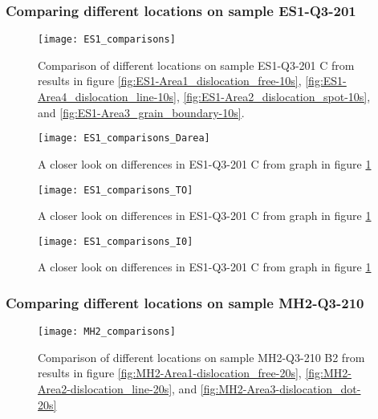 \subsubsection{Comparing different locations on sample ES1-Q3-201}

\begin{figure}[H]
\centering
\texttt{[image: ES1\_comparisons]}
\caption[ES1-Q3-201 comparisons]{Comparison of different locations on sample ES1-Q3-201 C from results in figure \ref{fig:ES1-Area1_dislocation_free-10s}, \ref{fig:ES1-Area4_dislocation_line-10s}, \ref{fig:ES1-Area2_dislocation_spot-10s}, and \ref{fig:ES1-Area3_grain_boundary-10s}. }
\label{fig:ES1_comparisons}%
\end{figure}

\begin{figure}[H]
\centering
\texttt{[image: ES1\_comparisons\_Darea]}
\caption[ES1-Q3-201 comparisons close]{A closer look on differences in ES1-Q3-201 C from graph in figure \ref{fig:ES1_comparisons} }
\label{fig:ES1_comparisons_Darea}%
\end{figure}

\begin{figure}[H]
\centering
\texttt{[image: ES1\_comparisons\_TO]}
\caption[ES1-Q3-201 comparisons close]{A closer look on differences in ES1-Q3-201 C from graph in figure \ref{fig:ES1_comparisons} }
\label{fig:ES1_comparisons_TO}%
\end{figure}

\begin{figure}[H]
\centering
\texttt{[image: ES1\_comparisons\_I0]}
\caption[ES1-Q3-201 comparisons close]{A closer look on differences in ES1-Q3-201 C from graph in figure \ref{fig:ES1_comparisons} }
\label{fig:ES1_comparisons_I0}%
\end{figure}


\subsubsection{Comparing different locations on sample MH2-Q3-210}

\begin{figure}[H]
\centering
\texttt{[image: MH2\_comparisons]}
\caption[MH2-Q3-210 comparisons]{Comparison of different locations on sample MH2-Q3-210 B2 from results in figure \ref{fig:MH2-Area1-dislocation_free-20s}, \ref{fig:MH2-Area2-dislocation_line-20s}, and \ref{fig:MH2-Area3-dislocation_dot-20s} }
\label{fig:MH2_comparisons}%
\end{figure}


